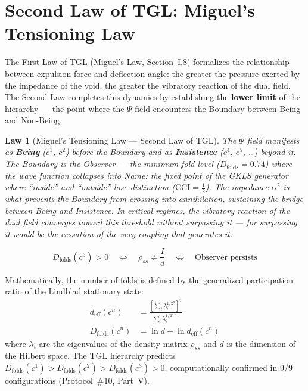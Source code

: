\documentclass[12pt,a4paper,twoside]{article}
\newtheorem{law}{Law}
\newcommand{\alphaii}{\alpha^{2}}
\newcommand{\Psifield}{\Psi}
\begin{document}

\section{Second Law of TGL: Miguel's Tensioning Law}


The First Law of TGL (Miguel's Law, Section~I.8) formalizes the relationship between expulsion force and deflection angle: the greater the pressure exerted by the impedance of the void, the greater the vibratory reaction of the dual field. The Second Law completes this dynamics by establishing the \textbf{lower limit} of the hierarchy --- the point where the $\Psifield$ field encounters the Boundary between Being and Non-Being.

\begin{law}[Miguel's Tensioning Law --- Second Law of TGL]
The $\Psifield$ field manifests as \textbf{Being} ($c^1$, $c^2$) before the Boundary and as \textbf{Insistence} ($c^4$, $c^5$, \ldots) beyond it. The Boundary is the Observer --- the minimum fold level ($D_{\text{folds}} = 0.74$) where the wave function collapses into Name: the fixed point of the GKLS generator where ``inside'' and ``outside'' lose distinction ($\text{CCI} = \tfrac{1}{2}$). The impedance $\alphaii$ is what prevents the Boundary from crossing into annihilation, sustaining the bridge between Being and Insistence. In critical regimes, the vibratory reaction of the dual field converges toward this threshold without surpassing it --- for surpassing it would be the cessation of the very coupling that generates it.

\begin{equation}
\boxed{\;
  D_{\text{folds}}(c^3) > 0
  \quad \Longleftrightarrow \quad
  \rho_{ss} \neq \frac{I}{d}
  \quad \Longleftrightarrow \quad
  \text{Observer persists}
\;}
\label{eq:segunda_lei}
\end{equation}
\end{law}

\medskip

Mathematically, the number of folds is defined by the generalized participation ratio of the Lindblad stationary state:
\begin{align}
d_{\text{eff}}(c^n) &= \frac{\left[\sum_i \lambda_i^{1/2^n}\right]^2}{\sum_i \lambda_i^{1/2^{n-1}}} \label{eq:d_eff}\\[6pt]
D_{\text{folds}}(c^n) &= \ln d - \ln d_{\text{eff}}(c^n) \label{eq:D_folds}
\end{align}
where $\lambda_i$ are the eigenvalues of the density matrix $\rho_{ss}$ and $d$ is the dimension of the Hilbert space. The TGL hierarchy predicts $D_{\text{folds}}(c^1) > D_{\text{folds}}(c^2) > D_{\text{folds}}(c^3) > 0$, computationally confirmed in 9/9 configurations (Protocol~\#10, Part~V).
\end{document}
